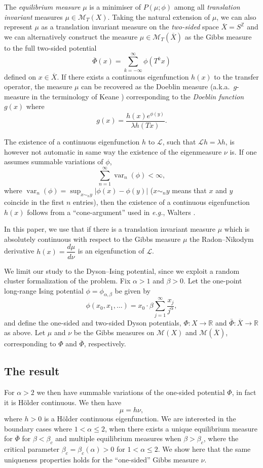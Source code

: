 \documentclass[11pt, a4paper]{amsart}
\theoremstyle{definition}
\theoremstyle{remark}
\providecommand{\RR}{\mathbb{R}}
\providecommand{\ZZ}{\mathbb{Z}}
\providecommand{\CM}{\mathscr{M}}
\providecommand{\mscr}{\mathscr}
\providecommand{\mc}{\mathcal}
\providecommand{\opn}{\operatorname}
\providecommand{\ol}{\overline}
\providecommand{\var}{\opn{var}}
\def\X{X}
\def\T{T}
\begin{document}
The \emph{equilibrium measure} $\mu$ is a minimiser of $P(\mu;\phi)$ among all
\emph{translation invariant} measures $\mu\in{\CM}_\T(\X)$. Taking the natural
extension of $\mu$, we can also represent $\mu$ as a translation invariant measure
on the \emph{two-sided} space $\ol\X = S^\ZZ$ and we can alternatively construct
the measure $\mu\in\CM_\T(\ol\X)$ as the Gibbs measure to the full two-sided potential
\[
  \ol \Phi(x)=\sum_{k=-\infty}^\infty \phi(\T^k x)
\]
defined on $x\in\ol\X$.
If there exists a continuous eigenfunction $h(x)$ to the transfer operator, the
measure $\mu$ can be recovered as the Doeblin measure \cite{berger2} (a.k.a.\
$g$-measure in the terminology of Keane \cite{keane}) corresponding to the
\emph{Doeblin function} $g(x)$ where
\begin{equation}\label{g}
  g(x)= \frac{h(x) e^{\phi(y)}}{\lambda h(\T x)}.
\end{equation}

The existence of a continuous eigenfunction $h$ to $\mc{L}$, such that
$\mc{L}h=\lambda h$, is however not automatic in same way the existence of the
eigenmeasure $\nu$ is. If one assumes summable variations of $\phi$,
\begin{equation}\label{sum}
  \sum_{n=1}^\infty \var_n (\phi)<\infty,
\end{equation}
where $\var_n(\phi)=\sup_{x\sim_n y}|\phi(x)-\phi(y)|$ ($x\sim_n y$ means that $x$ and $y$
coincide in the first $n$ entries), then the existence of a continuous
eigenfunction $h(x)$ follows from a ``cone-argument'' used in {\em
  e.g.}, Walters \cite{walters1}. 
  
In this paper, we use that if there is a translation invariant measure $\mu$ which is
absolutely continuous with respect to the Gibbs measure $\mu$ the Radon--Nikodym
derivative $h(x)=\dfrac{d\mu}{d\nu}$ is an eigenfunction of $\mscr L$.

We limit our study to the Dyson--Ising potential, since we exploit a random cluster formalization of
the problem. Fix $\alpha>1$ and $\beta>0$. Let the
one-point long-range Ising potential $\phi=\phi_{\alpha,\beta}$ be given by
$$\phi(x_0, x_1,\ldots)=x_0\cdot \beta \sum_{j=1}^\infty \frac{x_j}{j^\alpha},$$
and define the one-sided and two-sided Dyson potentials, $\Phi:\X\to \RR$ and
$\bar\Phi:\ol\X\to\RR$ as above. Let $\mu$ and $\nu$ be the Gibbs measures on $\CM(\X)$
and $\CM(\ol\X)$, corresponding to $\Phi$ and $\ol\Phi$, respectively.

\subsection{The result}
For $\alpha>2$ we then have summable variations of the one-sided potential $\Phi$, in
fact it is H\"older continuous. We then have
$$ \mu= h\nu, $$
where $h>0$ is a H\"older continuous eigenfunction. We are interested in the
boundary cases where $1<\alpha\le2$, when there exists a unique equilibrium measure for
$\ol\Phi$ for $\beta<\beta_c$ \cite{ACCN} and multiple equilibrium measures when $\beta>\beta_c$,
where the critical parameter $\beta_c=\beta_c(\alpha)>0$ for $1<\alpha\le2$. We show here that the
same uniqueness properties holds for the ``one-sided'' Gibbs measure $\nu$.
\end{document}
